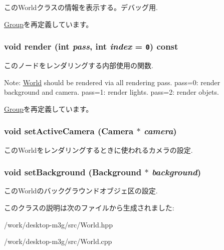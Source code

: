 このWorldクラスの情報を表示する。デバッグ用. 

\hyperlink{classm3g_1_1Group_6fea17fa1532df3794f8cb39cb4f911f}{Group}を再定義しています。\hypertarget{classm3g_1_1World_1efcb1973989d9963d5bd6d03065d389}{
\subsubsection[{render}]{\setlength{\rightskip}{0pt plus 5cm}void render (int {\em pass}, \/  int {\em index} = {\tt 0}) const}}
\label{classm3g_1_1World_1efcb1973989d9963d5bd6d03065d389}


このノードをレンダリングする内部使用の関数.

Note: \hyperlink{classm3g_1_1World}{World} should be rendered via all rendering pass. pass=0: render background and camera. pass=1: render lights. pass=2: render objets. 

\hyperlink{classm3g_1_1Group_1efcb1973989d9963d5bd6d03065d389}{Group}を再定義しています。\hypertarget{classm3g_1_1World_dd9a82b335e8521592ad410c662a5cfd}{
\subsubsection[{setActiveCamera}]{\setlength{\rightskip}{0pt plus 5cm}void setActiveCamera ({\bf Camera} $\ast$ {\em camera})}}
\label{classm3g_1_1World_dd9a82b335e8521592ad410c662a5cfd}


このWorldをレンダリングするときに使われるカメラの設定. \hypertarget{classm3g_1_1World_6193765c76d6dc0450f264918ebe7e1c}{
\subsubsection[{setBackground}]{\setlength{\rightskip}{0pt plus 5cm}void setBackground ({\bf Background} $\ast$ {\em background})}}
\label{classm3g_1_1World_6193765c76d6dc0450f264918ebe7e1c}


このWorldのバックグラウンドオブジェ区の設定. 

このクラスの説明は次のファイルから生成されました:\begin{CompactItemize}
\item 
/work/desktop-m3g/src/World.hpp\item 
/work/desktop-m3g/src/World.cpp\end{CompactItemize}

